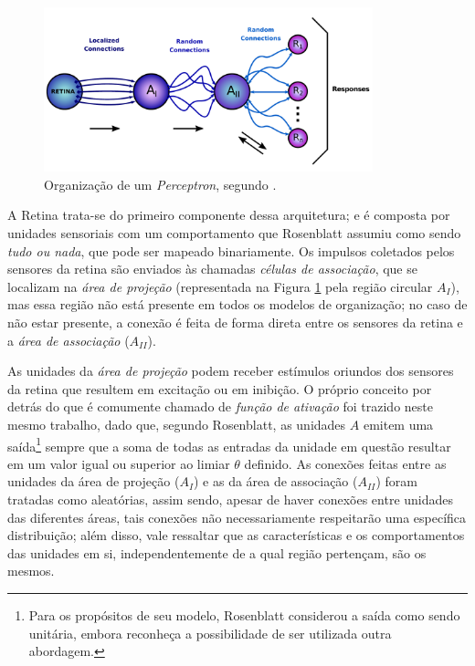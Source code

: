 \begin{figure}[H]
    \centering
    \includegraphics[width=0.85\textwidth]{figs/ann_perceptron_original_organization.pdf}
    \caption{Organização de um \textit{Perceptron}, segundo \citep{rosenblatt1958perceptron}.}
    \label{fig:ann_perceptron_organization}
\end{figure}

A Retina trata-se do primeiro componente dessa arquitetura; e é composta por unidades sensoriais com um comportamento que Rosenblatt assumiu como sendo \textit{tudo ou nada}, que pode ser mapeado binariamente. Os impulsos coletados pelos sensores da retina são enviados às chamadas \textit{células de associação}, que se localizam na \textit{área de projeção} (representada na Figura \ref{fig:ann_perceptron_organization} pela região circular $A_{I}$), mas essa região não está presente em todos os modelos de organização; no caso de não estar presente, a conexão é feita de forma direta entre os sensores da retina e a \textit{área de associação} ($A_{II}$).

As unidades da \textit{área de projeção} podem receber estímulos oriundos dos sensores da retina que resultem em excitação ou em inibição. O próprio conceito por detrás do que é comumente chamado de \textit{função de ativação} foi trazido neste mesmo trabalho, dado que, segundo Rosenblatt, as unidades $A$ emitem uma saída\footnote{Para os propósitos de seu modelo, Rosenblatt considerou a saída como sendo unitária, embora reconheça a possibilidade de ser utilizada outra abordagem.} sempre que a soma de todas as entradas da unidade em questão resultar em um valor igual ou superior ao limiar $\theta$ definido. As conexões feitas entre as unidades da área de projeção ($A_{I}$) e as da área de associação ($A_{II}$) foram tratadas como aleatórias, assim sendo, apesar de haver conexões entre unidades das diferentes áreas, tais conexões não necessariamente respeitarão uma específica distribuição; além disso, vale ressaltar que as características e os comportamentos das unidades em si, independentemente de a qual região pertençam, são os mesmos.


